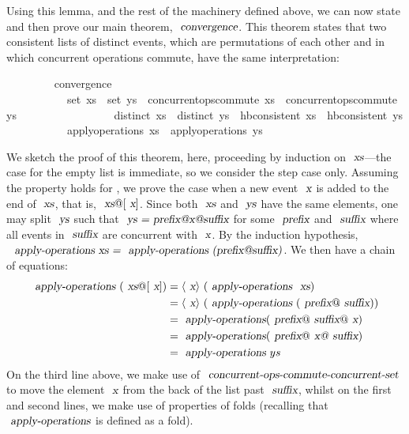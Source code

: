 Using this lemma, and the rest of the machinery defined above, we can now state and then prove our main theorem, $\isa{convergence}$.
This theorem states that two consistent lists of distinct events, which are permutations of each other and in which concurrent operations commute, have the same interpretation:
\vspace{0.375em}
\begin{isabellebody}
\ \ \ \ \ \ \ \  convergence{\isacharcolon}\isanewline
\ \ \ \ \ \ \ \ \ \ \ {\isachardoublequoteopen}set\ xs\ {\isacharequal}\ set\ ys{\isachardoublequoteclose}\ \ {\isachardoublequoteopen}concurrent{\isacharunderscore}ops{\isacharunderscore}commute\ xs{\isachardoublequoteclose}\ \ {\isachardoublequoteopen}concurrent{\isacharunderscore}ops{\isacharunderscore}commute\ ys{\isachardoublequoteclose}\isanewline
\ \ \ \ \ \ \ \ \ \ \ \ \ \ \ \ \ {\isachardoublequoteopen}distinct\ xs{\isachardoublequoteclose}\ \ {\isachardoublequoteopen}distinct\ ys{\isachardoublequoteclose}\ \ {\isachardoublequoteopen}hb{\isacharunderscore}consistent\ xs{\isachardoublequoteclose}\ \ {\isachardoublequoteopen}hb{\isacharunderscore}consistent\ ys{\isachardoublequoteclose}\isanewline
\ \ \ \ \ \ \ \ \ \ \ {\isachardoublequoteopen}apply{\isacharunderscore}operations\ xs\ {\isacharequal}\ apply{\isacharunderscore}operations\ ys{\isachardoublequoteclose}
\end{isabellebody}
\vspace{0.375em}
We sketch the proof of this theorem, here, proceeding by induction on $\isa{xs}$---the case for the empty list is immediate, so we consider the step case only.
Assuming the property holds for , we prove the case when a new event $\isa{x}$ is added to the end of $\isa{xs}$, that is, $\isa{xs}@[\isa{x}]$.
Since both $\isa{xs}$ and $\isa{ys}$ have the same elements, one may split $\isa{ys}$ such that $\isa{ys = prefix@x@suffix}$ for some $\isa{prefix}$ and $\isa{suffix}$ where all events in $\isa{suffix}$ are concurrent with $\isa{x}$.
By the induction hypothesis, $\isa{\isa{apply-operations}\ xs = \isa{apply-operations}\ (prefix@suffix)}$.
We then have a chain of equations:
{\small{\begin{align*}
  \isa{apply-operations}\ (\isa{xs}@[\isa{x}])
  &= \langle\isa{x}\rangle\ (\isa{apply-operations}\ \isa{xs}) \\
  &= \langle\isa{x}\rangle\ (\isa{apply-operations}\ (\isa{prefix}@\isa{suffix})) \\
  &= \isa{apply-operations} (\isa{prefix}@\isa{suffix}@\isa{x}) \\
  &= \isa{apply-operations} (\isa{prefix}@\isa{x@\isa{suffix}}) \\
  &= \isa{apply-operations}\ ys
\end{align*}}}
On the third line above, we make use of $\isa{concurrent-ops-commute-concurrent-set}$ to move the element $\isa{x}$ from the back of the list past $\isa{suffix}$, whilst on the first and second lines, we make use of properties of folds (recalling that $\isa{apply-operations}$ is defined as a fold).
